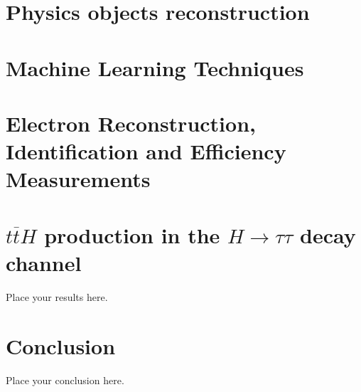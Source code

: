 \documentclass[11pt,twoside]{book}
\newcommand*{\ttH}{\ensuremath{t\overline{t}H}\xspace}
\begin{document}
\chapter{Physics objects reconstruction}
\label{chap:object_rec}


\chapter{Machine Learning Techniques}
\label{chap:machine_learning}


\chapter{Electron Reconstruction, Identification and Efficiency Measurements}
\label{chap:electrons}


\chapter{\ttH production in the $H \to \tau \tau$ decay channel}
\label{chap:htautau}


Place your results here.



\chapter{Conclusion}
\label{chap:conclusion}

Place your conclusion here.
\end{document}
